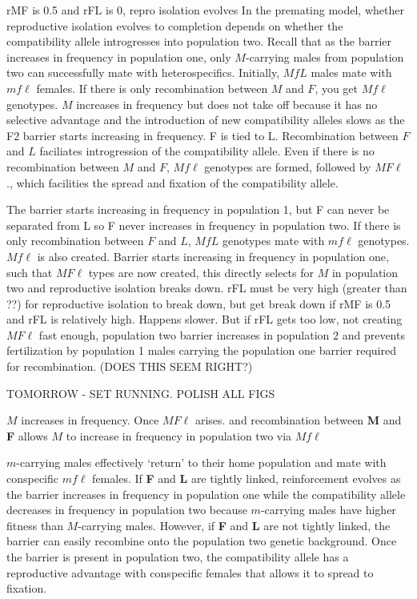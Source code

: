 \documentclass[11pt]{article}
\begin{document}
rMF is 0.5 and rFL is 0, repro isolation evolves
In the premating model, whether reproductive isolation evolves to completion depends on whether the compatibility allele introgresses into population two. Recall that as the barrier increases in frequency in population one, only $M$-carrying males from population two can successfully mate with heterospecifics. Initially, $MfL$ males mate with $mf\ell$ females. If there is only recombination between $M$ and $F$, you get $Mf\ell$ genotypes. $M$ increases in frequency but does not take off because it has no selective advantage and the introduction of new compatibility alleles slows as the F2 barrier starts increasing in frequency. F is tied to L. Recombination between $F$ and $L$ faciliates introgression of the compatibility allele. Even if there is no recombination between $M$ and $F$, $Mf\ell$ genotypes are formed, followed by $MF\ell$., which facilities the spread and fixation of the compatibility allele.

The barrier starts increasing in frequency in population 1, but F can never be separated from L so F never increases in frequency in population two. If there is only recombination between $F$ and $L$, $MfL$ genotypes mate with $mf\ell$ genotypes. $Mf\ell$ is also created. Barrier starts increasing in frequency in population one, such that $MF\ell$ types are now created, this directly selects for $M$ in population two and reproductive isolation breaks down. rFL must be very high (greater than ??) for reproductive isolation to break down, but get break down if rMF is 0.5 and rFL is relatively high. Happens slower. But if rFL gets too low, not creating $MF\ell$ fast enough, population two barrier increases in population 2 and prevents fertilization by population 1 males carrying the population one barrier required for recombination. (DOES THIS SEEM RIGHT?)

TOMORROW  - SET RUNNING.
POLISH ALL FIGS


  $M$ increases in frequency. Once $MF\ell$ arises. and recombination between \textbf{M} and \textbf{F} allows $M$ to increase in frequency in population two via $Mf\ell$

$m$-carrying males effectively `return' to their home population and mate with conspecific $mf\ell$ females. If \textbf{F} and \textbf{L} are tightly linked, reinforcement evolves as the barrier increases in frequency in population one while the compatibility allele decreases in frequency in population two because $m$-carrying males have higher fitness than $M$-carrying males. However, if \textbf{F} and \textbf{L} are not tightly linked, the barrier can easily recombine onto the population two genetic background. Once the barrier is present in population two, the compatibility allele has a reproductive advantage with conspecific females that allows it to spread to fixation. 
\end{document}

